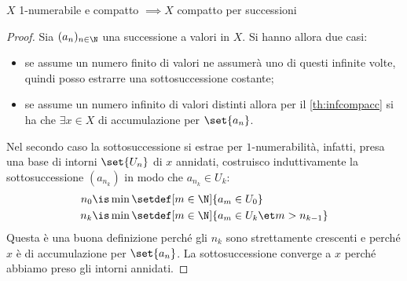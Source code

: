 


\begin{prop}
	$X$ 1-numerabile e compatto $\implies X$ compatto per successioni
\end{prop}

\begin{proof}
	Sia $(a_n)_{n\in\N}$ una successione a valori in $X$. Si hanno allora due casi:
	\begin{itemize}
		\item se assume un numero finito di valori ne assumerà uno di questi infinite volte, quindi posso estrarre una sottosuccessione costante;
		\item se assume un numero infinito di valori distinti allora per il \autoref{th:infcompacc} si ha che $\exists x\in X$ di accumulazione per $\set{a_n}$.
	\end{itemize}
	Nel secondo caso la sottosuccessione si estrae per $1$-numerabilità, infatti, presa una base di intorni $\set{U_n}$ di $x$ \wlg annidati, costruisco induttivamente la sottosuccessione $(a_{n_k})$ in modo che $a_{n_k}\in U_k$:
	\begin{align*}
		n_0 &\is \min\setdef[m\in\N]{a_m\in U_0} \\
		n_k &\is \min\setdef[m\in\N]{a_m\in U_k\et m>n_{k-1}}
	\end{align*}
	Questa è una buona definizione perché gli $n_k$ sono strettamente crescenti e perché $x$ è di accumulazione per $\set{a_n}$.
	La sottosuccessione converge a $x$ perché abbiamo preso gli intorni annidati.
\end{proof}

